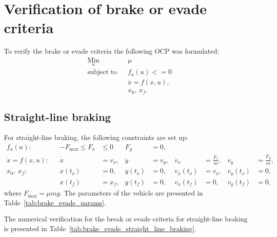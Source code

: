 \chapter{Verification of brake or evade criteria}

To verify the brake or evade criteria the following OCP was formulated:
\begin{align}
    & \underset{u}{\text{Min}}
    & & \mu\\
%
    & \text{subject to} 
    & & f_u(u) <= 0\\
%
    &&& \dot x = f(x,u),\\
%
    &&& x_0,\ x_f.
\end{align}

\section{Straight-line braking}\label{sec:prob3_STrbrk}
For straight-line braking, the following constraints are set up:
\begin{align}
    f_u(u): && -F_{\text{max}} \leq F_x &\leq 0 & F_y &= 0,\\
    \dot x = f(x,u): && \dot x &= v_x, & \dot y &= v_y, & \dot v_x &= \frac{F_x}{m}, & \dot v_y &= \frac{F_y}{m},\\
    x_0,\ x_f: && x(t_o) &= 0, & y(t_o) &= 0, & v_x(t_o) &= v_o, & v_y(t_o) &= 0,\\
    && x(t_f) &= x_f, & y(t_f) &= 0, & v_x(t_f) &= 0, & v_y(t_f) &= 0,
\end{align}
where $F_{\text{max}} = \mu m g$. The parameters of the vehicle are presented in Table~\ref{tab:brake_evade_params}.

The numerical verification for the break or evade criteria for straight-line braking is presented in Table~\ref{tab:brake_evade_straight_line_braking}.


